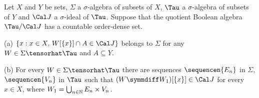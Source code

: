 Let $X$ and $Y$ be sets, $\Sigma$ a
$\sigma$-algebra
of subsets of $X$, $\Tau$ a $\sigma$-algebra of subsets of $Y$ and
$\Cal J$ a
$\sigma$-ideal of $\Tau$.   Suppose that the quotient Boolean algebra
$\Tau/\Cal J$ has a countable order-dense set.

(a) $\{x:x\in X,\,W[\{x\}]\cap A\in\Cal J\}$ belongs to $\Sigma$ for any
$W\in\Sigma\tensorhat\Tau$ and $A\subseteq Y$.

(b) For every $W\in\Sigma\tensorhat\Tau$ there are sequences
$\sequencen{E_n}$ in $\Sigma$, $\sequencen{V_n}$ in $\Tau$ such that
$(W\symmdiff W_1)[\{x\}]\in\Cal J$ for every
$x\in X$, where $W_1=\bigcup_{n\in\Bbb N}E_n\times V_n$.


